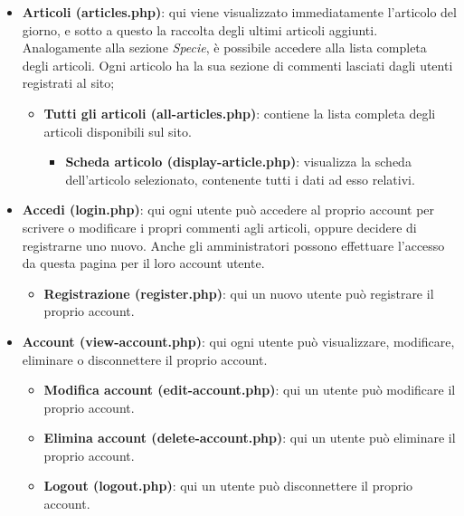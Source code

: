 \documentclass[12pt]{article}
\begin{document}
\begin{itemize}
		\item \textbf{Articoli (articles.php)}: qui viene visualizzato immediatamente l'articolo del giorno, e sotto a questo la raccolta degli ultimi articoli aggiunti. Analogamente alla sezione \textit{Specie}, è possibile accedere alla lista completa degli articoli. Ogni articolo ha la sua sezione di commenti lasciati dagli utenti registrati al sito;
		\begin{itemize}
			\item \textbf{Tutti gli articoli (all-articles.php)}: contiene la lista completa degli articoli disponibili sul sito.
			\begin{itemize}
				\item \textbf{Scheda articolo (display-article.php)}: visualizza la scheda dell'articolo selezionato, contenente tutti i dati ad esso relativi.
			\end{itemize}
		\end{itemize}
		\item \textbf{Accedi (login.php)}: qui ogni utente può accedere al proprio account per scrivere o modificare i propri commenti agli articoli, oppure decidere di registrarne uno nuovo. Anche gli amministratori possono effettuare l'accesso da questa pagina per il loro account utente.
		\begin{itemize}
			\item \textbf{Registrazione (register.php)}: qui un nuovo utente può registrare il proprio account.
		\end{itemize}
		
		\item \textbf{Account (view-account.php)}: qui ogni utente può visualizzare, modificare, eliminare o disconnettere il proprio account.
		\begin{itemize}
			\item \textbf{Modifica account (edit-account.php)}: qui un utente può modificare il proprio account.
		\end{itemize}
		\begin{itemize}
			\item \textbf{Elimina account (delete-account.php)}: qui un utente può eliminare il proprio account.
		\end{itemize}
		\begin{itemize}
			\item \textbf{Logout (logout.php)}: qui un utente può disconnettere il proprio account.
		\end{itemize}
		
	\end{itemize}
\end{document}

